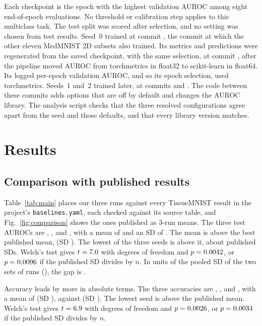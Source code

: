 \documentclass[conference]{IEEEtran}
\begin{document}
Each checkpoint is the epoch with the highest validation AUROC among eight end-of-epoch
evaluations. No threshold or calibration step applies to this multiclass task. The test
split was scored after selection, and no setting was chosen from test results. Seed~0
trained at commit \texttt{\commitSeedZero}, the commit at which the other eleven MedMNIST
2D subsets also trained. Its metrics and predictions were regenerated from the saved checkpoint, with
the same selection, at commit \texttt{\commitRescore}, after the pipeline moved AUROC from
torchmetrics in float32 to scikit-learn in float64. Its logged per-epoch validation
AUROC, and so its epoch selection, used torchmetrics. Seeds~1 and~2 trained later, at
commits \texttt{\commitSeedOne} and \texttt{\commitSeedTwo}. The code between these
commits adds options that are off by default and changes the AUROC library. The analysis
script checks that the three resolved configurations agree apart from the seed and those
defaults, and that every library version matches.

\section{Results}
\label{sec:results}



\subsection{Comparison with published results}

Table~\ref{tab:main} places our three runs against every TissueMNIST result in the
project's \texttt{baselines.yaml}, each checked against its source table, and
Fig.~\ref{fig:comparison} shows the ones published as 3-run means. The three test AUROCs
are \testAurocSeedZero{}, \testAurocSeedOne{}, and \testAurocSeedTwo{}, with a mean of
\testAurocMean{} and an SD of \testAurocSD{}. The mean is \gainMeanAuroc{} above the best
published mean, \baseBestAuroc{} (SD \baseBestAurocSD{}). The lowest of the three seeds is
\gainMinSeedAuroc{} above it, about \gainMinSeedInSDAuroc{} published SDs. Welch's test
gives $t=7.0{}$ with \welchDfAuroc{} degrees of freedom and $p=0.0042{}$,
or $p=0.0096{}$ if the published SD divides by $n$. In units of the pooled SD of
the two sets of runs (\pooledSDAuroc{}), the gap is \gainPooledSDAuroc{}.

Accuracy leads by more in absolute terms. The three accuracies are \testAccSeedZero{},
\testAccSeedOne{}, and \testAccSeedTwo{}, with a mean of \testAccMean{} (SD
\testAccSD{}), against \baseBestAcc{} (SD \baseBestAccSD{}). The lowest seed is
\gainMinSeedAcc{} above the published mean. Welch's test gives $t=6.9{}$ with
\welchDfAcc{} degrees of freedom and $p=0.0026{}$, or $p=0.0034{}$ if the
published SD divides by $n$.
\end{document}
